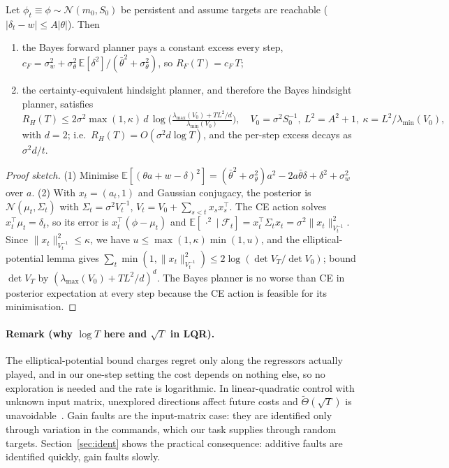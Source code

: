 \begin{theorem}\label{thm:separation}
Let $\phi_t\equiv\phi\sim\mathcal N(m_0,S_0)$ be persistent and assume targets are reachable
($|\delta_t-w|\le A|\theta|$). Then
\begin{enumerate}
\item the Bayes forward planner pays a constant excess every step,
  $c_F=\sigma_w^2+\sigma_\theta^2\,\mathbb E[\delta^2]/(\bar\theta^2+\sigma_\theta^2)$, so $R_F(T)=c_F\,T$;
\item the certainty-equivalent hindsight planner, and therefore the Bayes hindsight planner, satisfies
\begin{equation}
R_H(T)\le 2\sigma^2\max(1,\kappa)\,d\,\log\!\Big(\tfrac{\lambda_{\max}(V_0)+TL^2/d}{\lambda_{\min}(V_0)}\Big),\quad
V_0=\sigma^2S_0^{-1},\ L^2=A^2+1,\ \kappa=L^2/\lambda_{\min}(V_0),
\end{equation}
with $d=2$; i.e.\ $R_H(T)=O(\sigma^2 d\log T)$, and the per-step excess decays as $\sigma^2 d/t$.
\end{enumerate}
\end{theorem}
\begin{proof}[Proof sketch]
(1) Minimise $\mathbb E[(\theta a+w-\delta)^2]=(\bar\theta^2+\sigma_\theta^2)a^2-2a\bar\theta\delta+\delta^2+\sigma_w^2$
over $a$. (2) With $x_t=(a_t,1)$ and Gaussian conjugacy, the posterior is $\mathcal N(\mu_t,\Sigma_t)$ with
$\Sigma_t=\sigma^2V_t^{-1}$, $V_t=V_0+\sum_{s<t}x_sx_s^\top$. The CE action solves $x_t^\top\mu_t=\delta_t$, so its
error is $x_t^\top(\phi-\mu_t)$ and $\mathbb E[\,\cdot^2\mid\mathcal F_t]=x_t^\top\Sigma_tx_t=\sigma^2\|x_t\|^2_{V_t^{-1}}$.
Since $\|x_t\|^2_{V_t^{-1}}\le\kappa$, we have $u\le\max(1,\kappa)\min(1,u)$, and the elliptical-potential lemma
\citep[Lemma 11]{abbasi2011} gives $\sum_t\min(1,\|x_t\|^2_{V_{t}^{-1}})\le2\log(\det V_T/\det V_0)$; bound
$\det V_T$ by $(\lambda_{\max}(V_0)+TL^2/d)^d$. The Bayes planner is no worse than CE in posterior expectation at
every step because the CE action is feasible for its minimisation.
\end{proof}

\paragraph{Remark (why $\log T$ here and $\sqrt T$ in LQR).} The elliptical-potential bound charges regret only along
the regressors actually played, and in our one-step setting the cost depends on nothing else, so no exploration is
needed and the rate is logarithmic. In linear-quadratic control with unknown input matrix, unexplored directions
affect future costs and $\tilde\Theta(\sqrt T)$ is unavoidable~\citep{simchowitz2020,cassel2020}. Gain faults are
the input-matrix case: they are identified only through variation in the commands, which our task supplies through
random targets. Section~\ref{sec:ident} shows the practical consequence: additive faults are identified quickly,
gain faults slowly.

